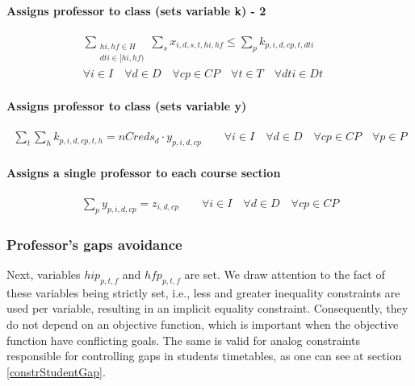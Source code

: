 \paragraph{Assigns professor to class (sets variable k) - 2}
\begin{eqnarray}
\sum_{ \substack {hi,hf \in H \\ dti \in [hi,hf)} } \sum\limits_{s} x_{i,d,s,t,hi,hf} \le \sum\limits_{p} k_{p,i,d,cp,t,dti} \nonumber \qquad
\\
\forall i \in I \quad
\forall d \in D \quad
\forall cp \in CP \quad
\forall t \in T \quad
\forall dti \in Dt
\end{eqnarray}
	
\paragraph{Assigns professor to class (sets variable y)}
\begin{eqnarray}
\sum\limits_{t} \sum\limits_{h} k_{p,i,d,cp,t,h} = nCreds_{d} \cdot y_{p,i,d,cp} \nonumber \qquad
\forall i \in I \quad
\forall d \in D \quad
\forall cp \in CP \quad
\forall p \in P
\end{eqnarray}	
	
\paragraph{Assigns a single professor to each course section}
\begin{eqnarray}
\sum\limits_{p} y_{p,i,d,cp} = z_{i,d,cp} \nonumber \qquad
\forall i \in I \quad
\forall d \in D \quad
\forall cp \in CP
\end{eqnarray}	


\subsubsection{Professor's gaps avoidance}
\label{constrProfessorGap}

Next, variables $hip_{p,t,f}$ and $hfp_{p,t,f}$ are set. We draw attention to the fact of these variables being strictly set, i.e., less and greater inequality constraints are used per variable, resulting in an implicit equality constraint. Consequently, they do not depend on an objective function, which is important when the objective function have conflicting goals. The same is valid for analog constraints responsible for controlling gaps in students timetables, as one can see at section \ref{constrStudentGap}.  

